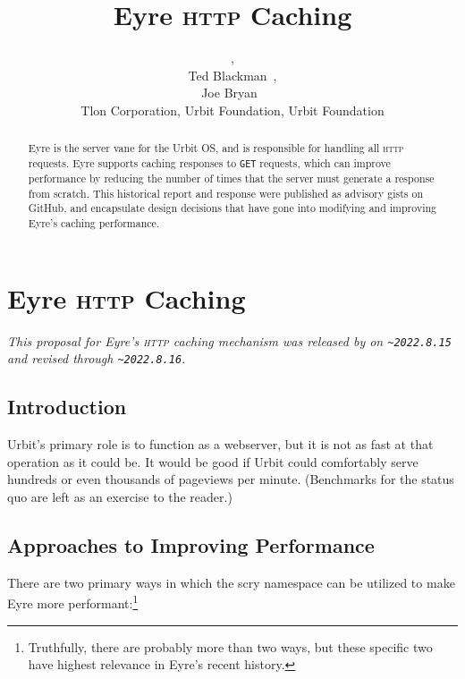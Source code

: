 \documentclass[twoside]{article}
\title{Eyre \textsc{http} Caching}
\author{\patp{palfun-foslup}, \\ Ted Blackman~\patp{rovyns-ricfer}, \\ Joe Bryan~\patp{master-morzod} \\ Tlon Corporation, Urbit Foundation, Urbit Foundation}
\date{}
\begin{document}
\maketitle
\thispagestyle{firststyle}

\begin{abstract}
  Eyre is the server vane for the Urbit OS, and is responsible for handling all \textsc{http} requests.  Eyre supports caching responses to \texttt{GET} requests, which can improve performance by reducing the number of times that the server must generate a response from scratch.  This historical report and response were published as advisory gists on GitHub, and encapsulate design decisions that have gone into modifying and improving Eyre's caching performance.
\end{abstract}

\setcounter{page}{1}

\tableofcontents

\section{Eyre \textsc{http} Caching}

\noindent\sloppy
\emph{This proposal for Eyre's \textsc{http} caching mechanism was released by  on \texttt{\textasciitilde 2022.8.15} and revised through \texttt{\textasciitilde 2022.8.16}.}

\subsection{Introduction}

Urbit's primary role is to function as a webserver, but it is not as fast at that operation as it could be.  It would be good if Urbit could comfortably serve hundreds or even thousands of pageviews per minute.  (Benchmarks for the status quo are left as an exercise to the reader.)

\subsection{Approaches to Improving Performance}

There are two primary ways in which the scry namespace can be utilized to make Eyre more performant:\footnote{Truthfully, there are probably more than two ways, but these specific two have highest relevance in Eyre's recent history.}
\end{document}
